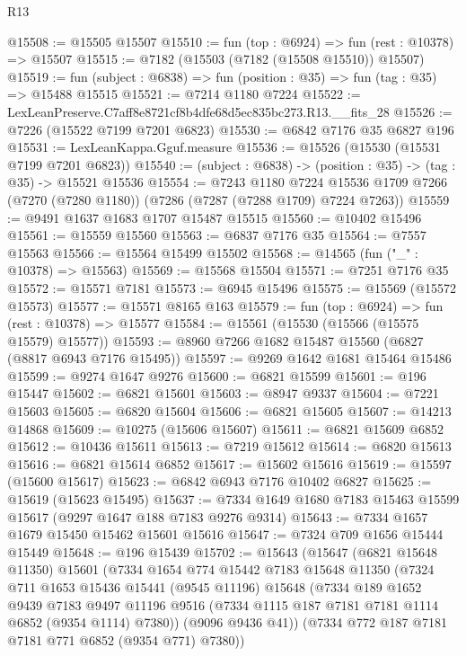 \begin{lexlean}{R13}
\begin{coremodule}
@15508 := @15505 @15507
@15510 := fun (top : @6924) => fun (rest : @10378) => @15507
@15515 := @7182 (@15503 (@7182 (@15508 @15510)) @15507)
@15519 := fun (subject : @6838) => fun (position : @35) => fun (tag : @35) => @15488 @15515
@15521 := @7214 @1180 @7224
@15522 := LexLeanPreserve.C7aff8e8721cf8b4dfe68d5ec835bc273.R13.__fits_28
@15526 := @7226 (@15522 @7199 @7201 @6823)
@15530 := @6842 @7176 @35 @6827 @196
@15531 := LexLeanKappa.Gguf.measure
@15536 := @15526 (@15530 (@15531 @7199 @7201 @6823))
@15540 := (subject : @6838) -> (position : @35) -> (tag : @35) -> @15521 @15536
@15554 := @7243
    @1180
    @7224
    @15536
    @1709
    @7266
    (@7270 (@7280 @1180))
    (@7286 (@7287 (@7288 @1709) @7224 @7263))
@15559 := @9491 @1637 @1683 @1707 @15487 @15515
@15560 := @10402 @15496
@15561 := @15559 @15560
@15563 := @6837 @7176 @35
@15564 := @7557 @15563
@15566 := @15564 @15499 @15502
@15568 := @14565 (fun ("_" : @10378) => @15563)
@15569 := @15568 @15504
@15571 := @7251 @7176 @35
@15572 := @15571 @7181
@15573 := @6945 @15496
@15575 := @15569 (@15572 @15573)
@15577 := @15571 @8165 @163
@15579 := fun (top : @6924) => fun (rest : @10378) => @15577
@15584 := @15561 (@15530 (@15566 (@15575 @15579) @15577))
@15593 := @8960 @7266 @1682 @15487 @15560 (@6827 (@8817 @6943 @7176 @15495))
@15597 := @9269 @1642 @1681 @15464 @15486
@15599 := @9274 @1647 @9276
@15600 := @6821 @15599
@15601 := @196 @15447
@15602 := @6821 @15601
@15603 := @8947 @9337
@15604 := @7221 @15603
@15605 := @6820 @15604
@15606 := @6821 @15605
@15607 := @14213 @14868
@15609 := @10275 (@15606 @15607)
@15611 := @6821 @15609 @6852
@15612 := @10436 @15611
@15613 := @7219 @15612
@15614 := @6820 @15613
@15616 := @6821 @15614 @6852
@15617 := @15602 @15616
@15619 := @15597 (@15600 @15617)
@15623 := @6842 @6943 @7176 @10402 @6827
@15625 := @15619 (@15623 @15495)
@15637 := @7334 @1649 @1680 @7183 @15463 @15599 @15617 (@9297 @1647 @188 @7183 @9276 @9314)
@15643 := @7334 @1657 @1679 @15450 @15462 @15601 @15616
@15647 := @7324 @709 @1656 @15444 @15449
@15648 := @196 @15439
@15702 := @15643
    (@15647
      (@6821 @15648 @11350)
      @15601
      (@7334
        @1654
        @774
        @15442
        @7183
        @15648
        @11350
        (@7324
          @711
          @1653
          @15436
          @15441
          (@9545 @11196)
          @15648
          (@7334
            @189
            @1652
            @9439
            @7183
            @9497
            @11196
            @9516
            (@7334 @1115 @187 @7181 @7181 @1114 @6852 (@9354 @1114) @7380))
          (@9096 @9436 @41))
        (@7334 @772 @187 @7181 @7181 @771 @6852 (@9354 @771) @7380))

\end{coremodule}
\end{lexlean}
